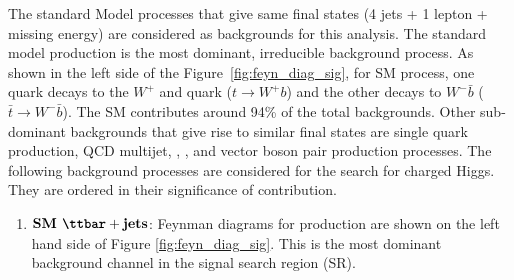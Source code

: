 The standard Model processes that give same final states (4 jets + 1 lepton + missing 
energy) are considered as backgrounds for this analysis. The standard model
\ttbar production is the most dominant, irreducible background process. 
As shown in the left side of the Figure~\ref{fig:feyn_diag_sig}, for
SM \ttbar process, one \PQt quark decays to the $W^+$ and \PQb quark 
($t\rightarrow W^+ b$) and the other decays to $W^- \bar{b}$ 
($\bar{t}\rightarrow W^-\bar{b}$). The SM \ttbar contributes around 94\%
of the total backgrounds. Other sub-dominant backgrounds that give rise to similar 
final states are single \PQt quark production, QCD multijet, \wjets, \dyjets, 
and vector boson pair production processes. The following background processes are considered
for the search for charged Higgs. They are ordered in their significance of contribution.
\begin{enumerate}[leftmargin=*]
\item $\textbf{SM \ttjets}$: Feynman diagrams 
	for \ttjets production are shown on the left hand side of Figure
	\ref{fig:feyn_diag_sig}. This is the most dominant background channel
	in the signal search region (SR).


\end{enumerate}
